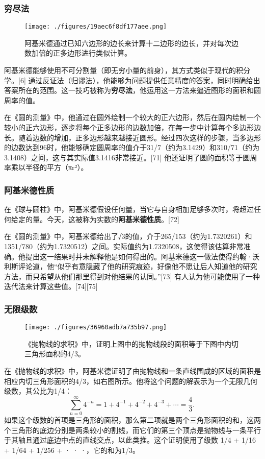 \subsubsection{穷尽法} 
\begin{figure}[ht]
\centering
\texttt{[image: ./figures/19aec6f8df177aee.png]}
\caption{阿基米德通过已知六边形的边长来计算十二边形的边长，并对每次边数加倍的正多边形进行类似计算。} \label{fig_Archim_5}
\end{figure}
阿基米德能够使用不可分割量（即无穷小量的前身），其方式类似于现代的积分学。[6] 通过反证法（归谬法），他能够为问题提供任意精度的答案，同时明确给出答案所在的范围。这一技巧被称为\textbf{穷尽法}，他运用这一方法来逼近图形的面积和圆周率的值。

在《圆的测量》中，他通过在圆外绘制一个较大的正六边形，然后在圆内绘制一个较小的正六边形，逐步将每个正多边形的边数加倍，在每一步中计算每个多边形边长。随着边数的增加，正多边形越来越接近圆形。经过四次这样的步骤，当多边形的边数达到96时，他能够确定圆周率的值介于3⁠1/7（约为3.1429）和3⁠10/71（约为3.1408）之间，这与其实际值3.1416非常接近。[71] 他还证明了圆的面积等于圆周率乘以半径的平方（πr²）。
\subsubsection{阿基米德性质}
在《球与圆柱》中，阿基米德假设任何量，当它与自身相加足够多次时，将超过任何给定的量。今天，这被称为实数的\textbf{阿基米德性质}。[72]

在《圆的测量》中，阿基米德给出了√3的值，介于265/153（约为1.7320261）和1351/780（约为1.7320512）之间。实际值约为1.7320508，这使得该估算非常准确。他提出这一结果时并未解释他是如何得出的。阿基米德这一做法使得约翰·沃利斯评论道，他“似乎有意隐藏了他的研究痕迹，好像他不愿让后人知道他的研究方法，而只希望从他们那里得到对他结果的认同。”[73] 有人认为他可能使用了一种迭代法来计算这些值。[74][75]
\subsubsection{无限级数}
\begin{figure}[ht]
\centering
\texttt{[image: ./figures/36960adb7a735b97.png]}
\caption{《抛物线的求积》中，证明上图中的抛物线段的面积等于下图中内切三角形面积的4/3。} \label{fig_Archim_6}
\end{figure}
在《抛物线的求积》中，阿基米德证明了由抛物线和一条直线围成的区域的面积是相应内切三角形面积的4/3，如右图所示。他将这个问题的解表示为一个无限几何级数，其公比为1/4：
\[
\sum_{n=0}^{\infty} 4^{-n} = 1 + 4^{-1} + 4^{-2} + 4^{-3} + \cdots = \frac{4}{3}.~
\]
如果这个级数的首项是三角形的面积，那么第二项就是两个三角形面积的和，这两个三角形的底边分别是两条较小的割线，而它们的第三个顶点是抛物线与一条平行于其轴且通过底边中点的直线交点，以此类推。这个证明使用了级数 1/4 + 1/16 + 1/64 + 1/256 + · · ·，它的和为1/3。
